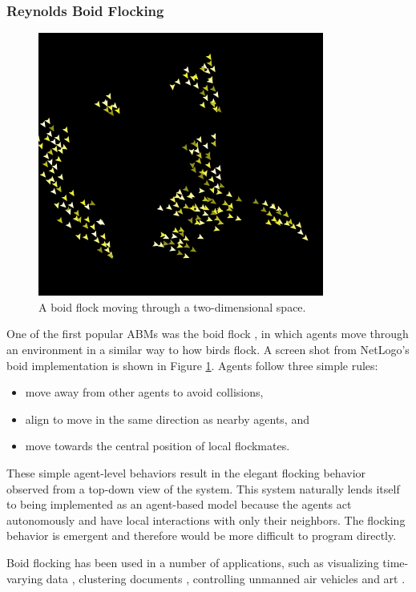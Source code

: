 \subsubsection{Reynolds Boid Flocking}

\begin{figure}[ht]
\centering
\includegraphics[scale=.66667]{images/netlogo_boidflock.png}
\caption{A boid flock moving through a two-dimensional space.}
\label{fig:netlogoboids}
\end{figure}

One of the first popular ABMs was the boid flock \cite{reynolds1987}\cite{reynolds1999sba}, in which agents move through an environment in a similar way to how birds flock.
A screen shot from NetLogo's boid implementation \cite{flocking} is shown in Figure \ref{fig:netlogoboids}.
Agents follow three simple rules:
   \begin{itemize}
      \item move away from other agents to avoid collisions,
      \item align to move in the same direction as nearby agents, and
      \item move towards the central position of local flockmates.
   \end{itemize}
These simple agent-level behaviors result in the elegant flocking behavior observed from a top-down view of the system.
This system naturally lends itself to being implemented as an agent-based model because the agents act autonomously and have local interactions with only their neighbors.
The flocking behavior is emergent and therefore would be more difficult to program directly.

Boid flocking has been used in a number of applications, such as visualizing time-varying data \cite{1382896}, clustering documents \cite{cui2006flocking}, controlling unmanned air vehicles \cite{crowther2003flocking} and art \cite{Boyd}.

